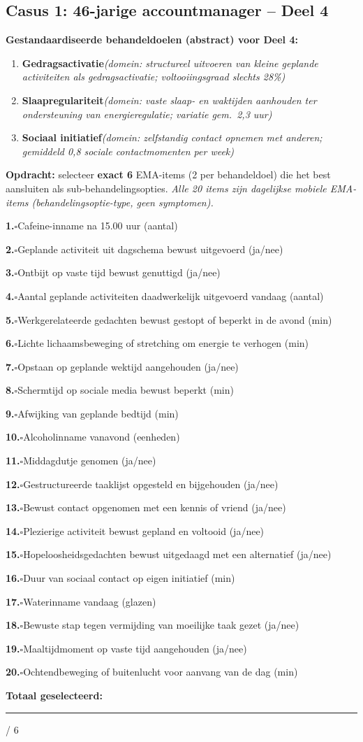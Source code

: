 \documentclass[11pt,a4paper]{article}
\newcommand{\checkitemBFS}[2]{%
\noindent\small\textbf{#1.}\hspace{0.45em}$\square$\hspace{0.4em}#2\par\vspace{0.20em}}
\begin{document}
\newpage
\subsection*{Casus 1: 46-jarige accountmanager -- Deel 4}

\begin{contextbox}
\small\textbf{Gestandaardiseerde behandeldoelen (abstract) voor Deel 4:}
\begin{enumerate}[topsep=2pt,itemsep=1pt,label=\arabic*.]
\item \textbf{Gedragsactivatie}\quad\textit{\small (domein: structureel uitvoeren van kleine geplande activiteiten als gedragsactivatie; voltooiingsgraad slechts 28\%)}
\item \textbf{Slaapregulariteit}\quad\textit{\small (domein: vaste slaap- en waktijden aanhouden ter ondersteuning van energieregulatie; variatie gem.\ 2,3 uur)}
\item \textbf{Sociaal initiatief}\quad\textit{\small (domein: zelfstandig contact opnemen met anderen; gemiddeld 0,8 sociale contactmomenten per week)}
\end{enumerate}
\end{contextbox}

\begin{responsebox}
\small\textbf{Opdracht:} selecteer \textbf{exact 6} EMA-items (2 per behandeldoel) die het best aansluiten als sub-behandelingsopties.
\textit{Alle 20 items zijn dagelijkse mobiele EMA-items (behandelingsoptie-type, geen symptomen).}

\checkitemBFS{1}{Cafeine-inname na 15.00 uur (aantal)}
\checkitemBFS{2}{Geplande activiteit uit dagschema bewust uitgevoerd (ja/nee)}
\checkitemBFS{3}{Ontbijt op vaste tijd bewust genuttigd (ja/nee)}
\checkitemBFS{4}{Aantal geplande activiteiten daadwerkelijk uitgevoerd vandaag (aantal)}
\checkitemBFS{5}{Werkgerelateerde gedachten bewust gestopt of beperkt in de avond (min)}
\checkitemBFS{6}{Lichte lichaamsbeweging of stretching om energie te verhogen (min)}
\checkitemBFS{7}{Opstaan op geplande wektijd aangehouden (ja/nee)}
\checkitemBFS{8}{Schermtijd op sociale media bewust beperkt (min)}
\checkitemBFS{9}{Afwijking van geplande bedtijd (min)}
\checkitemBFS{10}{Alcoholinname vanavond (eenheden)}
\checkitemBFS{11}{Middagdutje genomen (ja/nee)}
\checkitemBFS{12}{Gestructureerde taaklijst opgesteld en bijgehouden (ja/nee)}
\checkitemBFS{13}{Bewust contact opgenomen met een kennis of vriend (ja/nee)}
\checkitemBFS{14}{Plezierige activiteit bewust gepland en voltooid (ja/nee)}
\checkitemBFS{15}{Hopeloosheidsgedachten bewust uitgedaagd met een alternatief (ja/nee)}
\checkitemBFS{16}{Duur van sociaal contact op eigen initiatief (min)}
\checkitemBFS{17}{Waterinname vandaag (glazen)}
\checkitemBFS{18}{Bewuste stap tegen vermijding van moeilijke taak gezet (ja/nee)}
\checkitemBFS{19}{Maaltijdmoment op vaste tijd aangehouden (ja/nee)}
\checkitemBFS{20}{Ochtendbeweging of buitenlucht voor aanvang van de dag (min)}
\vspace{0.4em}
\noindent\textbf{Totaal geselecteerd:}\hspace{0.5em}\rule{1.2cm}{0.25pt}\hspace{0.2em}/ 6
\end{responsebox}
\end{document}
